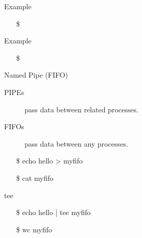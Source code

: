 \begin{frame}{Example}
\begin{center}
\end{center}
\begin{itemize}
\item[\$] 
\end{itemize}
\end{frame}

\begin{frame}{Example}
\begin{center}
\end{center}
\begin{itemize}
\item[\$] 
\end{itemize}
\end{frame}


\begin{frame}{Named Pipe (FIFO)}
  \begin{description}
  \item[PIPEs] pass data between related processes.
  \item[FIFOs] pass data between any processes.
  \end{description}
  \begin{block}{}
    \begin{center}
      \begin{minipage}{.45\linewidth}\ttfamily
        \begin{itemize}
        \item[\$] echo hello > myfifo
        \item[\$] cat myfifo
        \end{itemize}
      \end{minipage}\quad
      \begin{minipage}{.5\linewidth}
      \end{minipage}
    \end{center}
  \end{block}
  \ttfamily
  \begin{block}{tee}
    \begin{minipage}{.5\linewidth}
      \begin{itemize}
      \item[\$] echo hello | tee myfifo
      \item[\$] wc myfifo
      \end{itemize}
    \end{minipage}\quad
    \begin{minipage}{.45\linewidth}
    \end{minipage}
  \end{block}
\end{frame}

